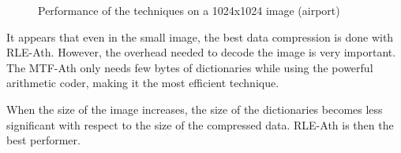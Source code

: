\begin{figure}[h]
	\centering
	\caption{Performance of the techniques on a 1024x1024 image (airport)}
	\label{fig:big}
\end{figure}

It appears that even in the small image, the best data compression is done with RLE-Ath. However, the overhead needed to decode the image is very important. The MTF-Ath only needs few bytes of dictionaries while using the powerful arithmetic coder, making it the most efficient technique. 

When the size of the image increases, the size of the dictionaries becomes less significant with respect to the size of the compressed data. RLE-Ath is then the best performer.